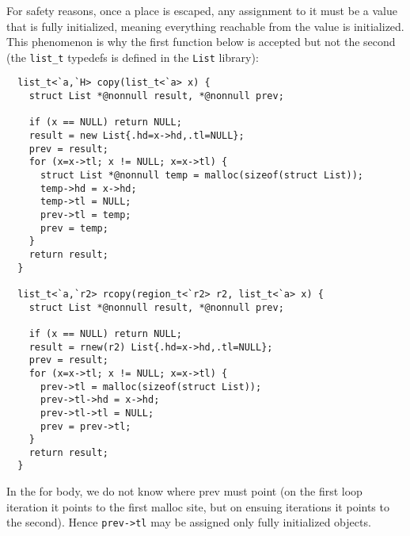 For safety reasons, once a place is escaped, any assignment to it must
be a value that is fully initialized, meaning everything reachable
from the value is initialized. This phenomenon is why the first
function below is accepted but not the second (the \texttt{list_t}
typedefs is defined in the \texttt{List} library):
\begin{verbatim}
  list_t<`a,`H> copy(list_t<`a> x) {
    struct List *@nonnull result, *@nonnull prev;

    if (x == NULL) return NULL;
    result = new List{.hd=x->hd,.tl=NULL};
    prev = result;
    for (x=x->tl; x != NULL; x=x->tl) {
      struct List *@nonnull temp = malloc(sizeof(struct List));
      temp->hd = x->hd;
      temp->tl = NULL;
      prev->tl = temp;
      prev = temp;
    }
    return result;
  }  

  list_t<`a,`r2> rcopy(region_t<`r2> r2, list_t<`a> x) {
    struct List *@nonnull result, *@nonnull prev;

    if (x == NULL) return NULL;
    result = rnew(r2) List{.hd=x->hd,.tl=NULL};
    prev = result;
    for (x=x->tl; x != NULL; x=x->tl) {
      prev->tl = malloc(sizeof(struct List));
      prev->tl->hd = x->hd;
      prev->tl->tl = NULL;
      prev = prev->tl;
    }
    return result;
  }  

\end{verbatim}

In the for body, we do not know where prev must point (on the first
loop iteration it points to the first malloc site, but on ensuing
iterations it points to the second).  Hence \texttt{prev->tl} may be
assigned only fully initialized objects.

